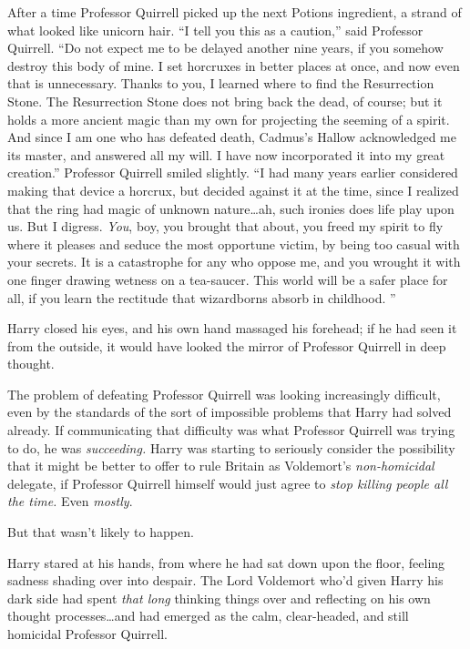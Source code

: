 After a time Professor Quirrell picked up the next Potions ingredient, a strand of what looked like unicorn hair. “I tell you this as a caution,” said Professor Quirrell. “Do not expect me to be delayed another nine years, if you somehow destroy this body of mine. I set horcruxes in better places at once, and now even that is unnecessary. Thanks to you, I learned where to find the Resurrection Stone. The Resurrection Stone does not bring back the dead, of course; but it holds a more ancient magic than my own for projecting the seeming of a spirit. And since I am one who has defeated death, Cadmus’s Hallow acknowledged me its master, and answered all my will. I have now incorporated it into my great creation.” Professor Quirrell smiled slightly. “I had many years earlier considered making that device a horcrux, but decided against it at the time, since I realized that the ring had magic of unknown nature…ah, such ironies does life play upon us. But I digress. \emph{You}, boy, you brought that about, you freed my spirit to fly where it pleases and seduce the most opportune victim, by being too casual with your secrets. It is a catastrophe for any who oppose me, and you wrought it with one finger drawing wetness on a tea-saucer. This world will be a safer place for all, if you learn the rectitude that wizardborns absorb in childhood. ”

Harry closed his eyes, and his own hand massaged his forehead; if he had seen it from the outside, it would have looked the mirror of Professor Quirrell in deep thought.

The problem of defeating Professor Quirrell was looking increasingly difficult, even by the standards of the sort of impossible problems that Harry had solved already. If communicating that difficulty was what Professor Quirrell was trying to do, he was \emph{succeeding.} Harry was starting to seriously consider the possibility that it might be better to offer to rule Britain as Voldemort’s \emph{non-homicidal} delegate, if Professor Quirrell himself would just agree to \emph{stop killing people all the time.} Even \emph{mostly}.

But that wasn’t likely to happen.

Harry stared at his hands, from where he had sat down upon the floor, feeling sadness shading over into despair. The Lord Voldemort who’d given Harry his dark side had spent \emph{that long} thinking things over and reflecting on his own thought processes…and had emerged as the calm, clear-headed, and still homicidal Professor Quirrell.

